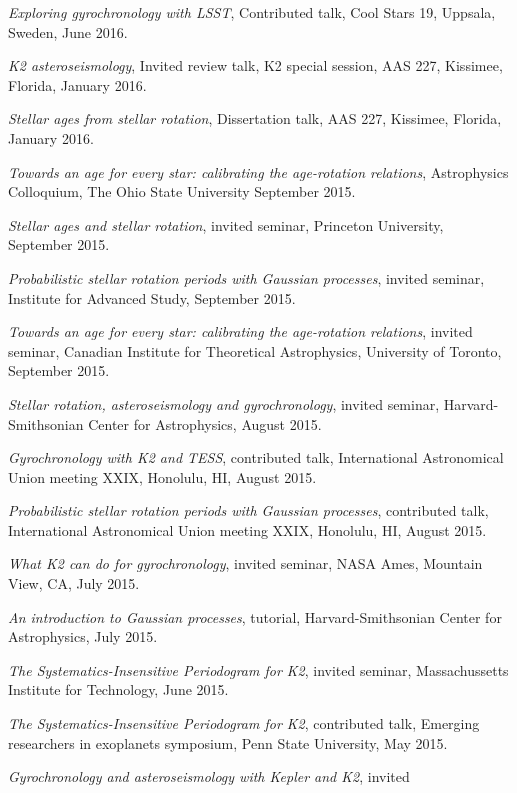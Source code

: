 \documentclass[12pt,letterpaper]{article}
\begin{document}
\begin{list}{}{\cvlist}
\item
{\it Exploring gyrochronology with LSST}, Contributed talk, Cool Stars 19,
Uppsala, Sweden, June 2016.
\item
{\it K2 asteroseismology}, Invited review talk, K2 special session, AAS 227,
Kissimee, Florida, January 2016.
\item
{\it Stellar ages from stellar rotation}, Dissertation talk, AAS 227,
Kissimee, Florida, January 2016.
\item
{\it Towards an age for every star: calibrating the age-rotation relations},
Astrophysics Colloquium, The Ohio State University September 2015.
\item
{\it Stellar ages and stellar rotation}, invited seminar, Princeton
University, September 2015.
\item
{\it Probabilistic stellar rotation periods with Gaussian processes},
invited seminar, Institute for Advanced Study, September 2015.
\item
{\it Towards an age for every star: calibrating the age-rotation relations},
invited seminar, Canadian Institute for Theoretical Astrophysics,
University of Toronto, September 2015.
\item
{\it Stellar rotation, asteroseismology and gyrochronology}, invited seminar,
Harvard-Smithsonian Center for Astrophysics, August 2015.
\item
{\it Gyrochronology with K2 and TESS}, contributed talk, International
Astronomical Union meeting XXIX, Honolulu, HI, August 2015.
\item
{\it Probabilistic stellar rotation periods with Gaussian processes},
contributed talk, International Astronomical Union meeting XXIX, Honolulu, HI,
August 2015.
\item
{\it What K2 can do for gyrochronology}, invited seminar, NASA Ames, Mountain
View, CA, July 2015.
\item
{\it An introduction to Gaussian processes}, tutorial, Harvard-Smithsonian
Center for Astrophysics, July 2015.
\item
{\it The Systematics-Insensitive Periodogram for K2}, invited seminar,
Massachussetts Institute for Technology, June 2015.
\item
{\it The Systematics-Insensitive Periodogram for K2}, contributed talk,
Emerging researchers in exoplanets symposium, Penn State University, May 2015.
\item
{\it Gyrochronology and asteroseismology with Kepler and K2}, invited

\end{list}
\end{document}
